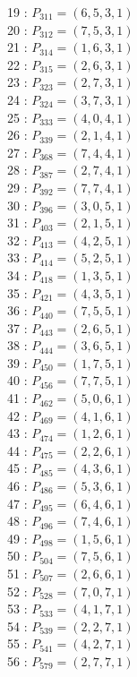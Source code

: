 \documentclass{article}
\begin{document}
{\begin{multicols}{2}
19 : $P_{311}=( 6, 5, 3, 1 )$\\
20 : $P_{312}=( 7, 5, 3, 1 )$\\
21 : $P_{314}=( 1, 6, 3, 1 )$\\
22 : $P_{315}=( 2, 6, 3, 1 )$\\
23 : $P_{323}=( 2, 7, 3, 1 )$\\
24 : $P_{324}=( 3, 7, 3, 1 )$\\
25 : $P_{333}=( 4, 0, 4, 1 )$\\
26 : $P_{339}=( 2, 1, 4, 1 )$\\
27 : $P_{368}=( 7, 4, 4, 1 )$\\
28 : $P_{387}=( 2, 7, 4, 1 )$\\
29 : $P_{392}=( 7, 7, 4, 1 )$\\
30 : $P_{396}=( 3, 0, 5, 1 )$\\
31 : $P_{403}=( 2, 1, 5, 1 )$\\
32 : $P_{413}=( 4, 2, 5, 1 )$\\
33 : $P_{414}=( 5, 2, 5, 1 )$\\
34 : $P_{418}=( 1, 3, 5, 1 )$\\
35 : $P_{421}=( 4, 3, 5, 1 )$\\
36 : $P_{440}=( 7, 5, 5, 1 )$\\
37 : $P_{443}=( 2, 6, 5, 1 )$\\
38 : $P_{444}=( 3, 6, 5, 1 )$\\
39 : $P_{450}=( 1, 7, 5, 1 )$\\
40 : $P_{456}=( 7, 7, 5, 1 )$\\
41 : $P_{462}=( 5, 0, 6, 1 )$\\
42 : $P_{469}=( 4, 1, 6, 1 )$\\
43 : $P_{474}=( 1, 2, 6, 1 )$\\
44 : $P_{475}=( 2, 2, 6, 1 )$\\
45 : $P_{485}=( 4, 3, 6, 1 )$\\
46 : $P_{486}=( 5, 3, 6, 1 )$\\
47 : $P_{495}=( 6, 4, 6, 1 )$\\
48 : $P_{496}=( 7, 4, 6, 1 )$\\
49 : $P_{498}=( 1, 5, 6, 1 )$\\
50 : $P_{504}=( 7, 5, 6, 1 )$\\
51 : $P_{507}=( 2, 6, 6, 1 )$\\
52 : $P_{528}=( 7, 0, 7, 1 )$\\
53 : $P_{533}=( 4, 1, 7, 1 )$\\
54 : $P_{539}=( 2, 2, 7, 1 )$\\
55 : $P_{541}=( 4, 2, 7, 1 )$\\
56 : $P_{579}=( 2, 7, 7, 1 )$\\
\end{multicols}
}
\end{document}
